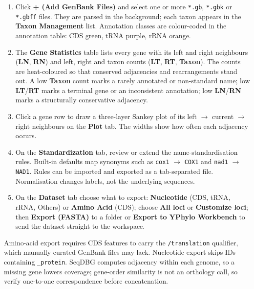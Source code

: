 \documentclass[10pt]{report}
\begin{document}
\begin{enumerate}
  \item Click \textbf{+ (Add GenBank Files)} and select one or more
        \texttt{*.gb}, \texttt{*.gbk} or \texttt{*.gbff} files. They are parsed
        in the background; each taxon appears in the \textbf{Taxon Management}
        list. Annotation classes are colour-coded in the annotation table:
        CDS green, tRNA purple, rRNA orange.
  \item The \textbf{Gene Statistics} table lists every gene with its left and
        right neighbours (\textbf{LN}, \textbf{RN}) and left, right and taxon
        counts (\textbf{LT}, \textbf{RT}, \textbf{Taxon}). The counts are
        heat-coloured so that conserved adjacencies and rearrangements stand
        out. A low \textbf{Taxon} count marks a rarely annotated or
        non-standard name; low \textbf{LT}/\textbf{RT} marks a terminal gene or
        an inconsistent annotation; low \textbf{LN}/\textbf{RN} marks a
        structurally conservative adjacency.
  \item Click a gene row to draw a three-layer Sankey plot of its
        left $\rightarrow$ current $\rightarrow$ right neighbours on the
        \textbf{Plot} tab. The widths show how often each adjacency occurs.
  \item On the \textbf{Standardization} tab, review or extend the
        name-standardisation rules. Built-in defaults map synonyms such as
        \texttt{cox1} $\rightarrow$ \texttt{COX1} and
        \texttt{nad1} $\rightarrow$ \texttt{NAD1}. Rules can be imported and
        exported as a tab-separated file. Normalisation changes labels, not
        the underlying sequences.
  \item On the \textbf{Dataset} tab choose what to export: \textbf{Nucleotide}
        (CDS, tRNA, rRNA, Others) or \textbf{Amino Acid} (CDS); choose
        \textbf{All loci} or \textbf{Customize loci}; then \textbf{Export
        (FASTA)} to a folder or \textbf{Export to YPhylo Workbench} to send the
        dataset straight to the workspace.
\end{enumerate}

Amino-acid export requires CDS features to carry the \texttt{/translation}
qualifier, which manually curated GenBank files may lack. Nucleotide export
skips IDs containing \texttt{\_protein}. SeqDBG computes adjacency within each
genome, so a missing gene lowers coverage; gene-order similarity is not an
orthology call, so verify one-to-one correspondence before concatenation.
\end{document}
